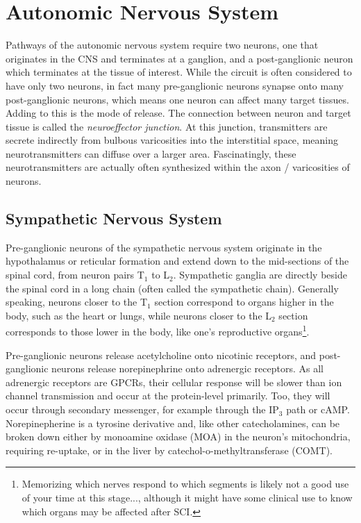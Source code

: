 \documentclass[12pt]{report}
\begin{document}
\section{Autonomic Nervous System}
Pathways of the autonomic nervous system require two neurons, one that originates in the CNS and terminates at a ganglion, and a post-ganglionic neuron which terminates at the tissue of interest. While the circuit is often considered to have only two neurons, in fact many pre-ganglionic neurons synapse onto many post-ganglionic neurons, which means one neuron can affect many target tissues. Adding to this is the mode of release. The connection between neuron and target tissue is called the \textit{neuroeffector junction}. At this junction, transmitters are secrete indirectly from bulbous varicosities into the interstitial space, meaning neurotransmitters can diffuse over a larger area. Fascinatingly, these neurotransmitters are actually often synthesized within the axon / varicosities of neurons. 

\subsection{Sympathetic Nervous System}
Pre-ganglionic neurons of the sympathetic nervous system originate in the hypothalamus or reticular formation and extend down to the mid-sections of the spinal cord, from neuron pairs T$_1$ to L$_2$. Sympathetic ganglia are directly beside the spinal cord in a long chain (often called the sympathetic chain). Generally speaking, neurons closer to the T$_1$ section correspond to organs higher in the body, such as the heart or lungs, while neurons closer to the L$_2$ section corresponds to those lower in the body, like one's reproductive organs\footnote{Memorizing which nerves respond to which segments is likely not a good use of your time at this stage..., although it might have some clinical use to know which organs may be affected after SCI.}.\newline

Pre-ganglionic neurons release acetylcholine onto nicotinic receptors,  and post-ganglionic neurons release norepinephrine onto adrenergic receptors. As all adrenergic receptors are GPCRs, their cellular response will be slower than ion channel transmission and occur at the protein-level primarily. Too, they will occur through secondary messenger, for example through the IP$_3$ path or cAMP. Norepinepherine is a tyrosine derivative and, like other catecholamines, can be broken down either by monoamine oxidase (MOA) in the neuron's mitochondria, requiring re-uptake, or in the liver by catechol-o-methyltransferase (COMT).\newline
\end{document}
